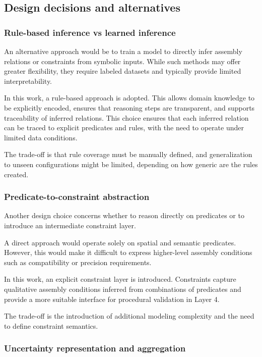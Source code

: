 \documentclass[11pt,titlepage,openright]{book}
\begin{document}
\subsection{Design decisions and alternatives}
\label{sub:layer3-method-design-decisions}

\subsubsection{Rule-based inference vs learned inference}
An alternative approach would be to train a model to directly infer assembly relations or constraints from symbolic inputs. While such methods may offer greater flexibility, they require labeled datasets and typically provide limited interpretability.

In this work, a rule-based approach is adopted. This allows domain knowledge to be explicitly encoded, ensures that reasoning steps are transparent, and supports traceability of inferred relations. This choice ensures that each inferred relation can be traced to explicit predicates and rules, with the need to operate under limited data conditions.

The trade-off is that rule coverage must be manually defined, and generalization to unseen configurations might be limited, depending on how generic are the rules created.

\subsubsection{Predicate-to-constraint abstraction}

Another design choice concerns whether to reason directly on predicates or to introduce an intermediate constraint layer.

A direct approach would operate solely on spatial and semantic predicates. However, this would make it difficult to express higher-level assembly conditions such as compatibility or precision requirements.

In this work, an explicit constraint layer is introduced. Constraints capture qualitative assembly conditions inferred from combinations of predicates and provide a more suitable interface for procedural validation in Layer 4.

The trade-off is the introduction of additional modeling complexity and the need to define constraint semantics.

\subsubsection{Uncertainty representation and aggregation}
\end{document}
